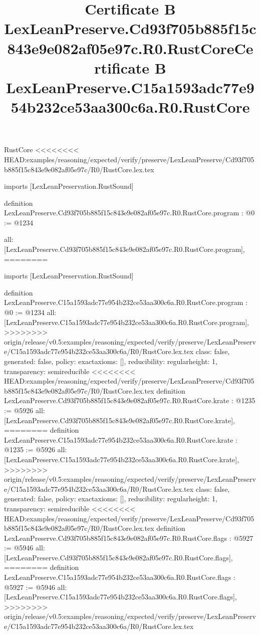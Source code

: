 \begin{lexlean}{RustCore}
<<<<<<<< HEAD:examples/reasoning/expected/verify/preserve/LexLeanPreserve/Cd93f705b885f15c843e9e082af05e97c/R0/RustCore.lex.tex
\title{Certificate B LexLeanPreserve.Cd93f705b885f15c843e9e082af05e97c.R0.RustCore}
\begin{coremodule}
imports [LexLeanPreservation.RustSound]

definition LexLeanPreserve.Cd93f705b885f15c843e9e082af05e97c.R0.RustCore.program : @0 := @1234 {
  all: [LexLeanPreserve.Cd93f705b885f15c843e9e082af05e97c.R0.RustCore.program],
========
\title{Certificate B LexLeanPreserve.C15a1593adc77e954b232ce53aa300c6a.R0.RustCore}
\begin{coremodule}
imports [LexLeanPreservation.RustSound]

definition LexLeanPreserve.C15a1593adc77e954b232ce53aa300c6a.R0.RustCore.program : @0 := @1234 {
  all: [LexLeanPreserve.C15a1593adc77e954b232ce53aa300c6a.R0.RustCore.program],
>>>>>>>> origin/release/v0.5:examples/reasoning/expected/verify/preserve/LexLeanPreserve/C15a1593adc77e954b232ce53aa300c6a/R0/RustCore.lex.tex
  class: false,
  generated: false,
  policy: exact{axioms: []},
  reducibility: regular{height: 1},
  transparency: semireducible
}
<<<<<<<< HEAD:examples/reasoning/expected/verify/preserve/LexLeanPreserve/Cd93f705b885f15c843e9e082af05e97c/R0/RustCore.lex.tex
definition LexLeanPreserve.Cd93f705b885f15c843e9e082af05e97c.R0.RustCore.krate : @1235 := @5926 {
  all: [LexLeanPreserve.Cd93f705b885f15c843e9e082af05e97c.R0.RustCore.krate],
========
definition LexLeanPreserve.C15a1593adc77e954b232ce53aa300c6a.R0.RustCore.krate : @1235 := @5926 {
  all: [LexLeanPreserve.C15a1593adc77e954b232ce53aa300c6a.R0.RustCore.krate],
>>>>>>>> origin/release/v0.5:examples/reasoning/expected/verify/preserve/LexLeanPreserve/C15a1593adc77e954b232ce53aa300c6a/R0/RustCore.lex.tex
  class: false,
  generated: false,
  policy: exact{axioms: []},
  reducibility: regular{height: 1},
  transparency: semireducible
}
<<<<<<<< HEAD:examples/reasoning/expected/verify/preserve/LexLeanPreserve/Cd93f705b885f15c843e9e082af05e97c/R0/RustCore.lex.tex
definition LexLeanPreserve.Cd93f705b885f15c843e9e082af05e97c.R0.RustCore.flags : @5927 := @5946 {
  all: [LexLeanPreserve.Cd93f705b885f15c843e9e082af05e97c.R0.RustCore.flags],
========
definition LexLeanPreserve.C15a1593adc77e954b232ce53aa300c6a.R0.RustCore.flags : @5927 := @5946 {
  all: [LexLeanPreserve.C15a1593adc77e954b232ce53aa300c6a.R0.RustCore.flags],
>>>>>>>> origin/release/v0.5:examples/reasoning/expected/verify/preserve/LexLeanPreserve/C15a1593adc77e954b232ce53aa300c6a/R0/RustCore.lex.tex
}}}
\end{coremodule}}
\end{coremodule}
\end{lexlean}
